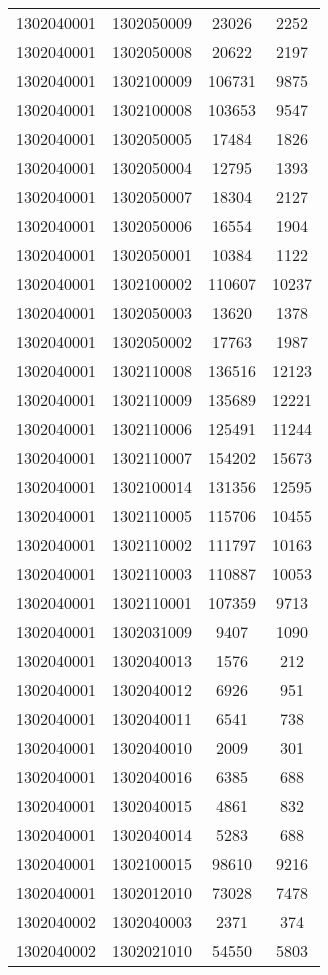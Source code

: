 \begin{longtable}{llcc}
1302040001 & 1302050009 & 23026 & 2252\\
1302040001 & 1302050008 & 20622 & 2197\\
1302040001 & 1302100009 & 106731 & 9875\\
1302040001 & 1302100008 & 103653 & 9547\\
1302040001 & 1302050005 & 17484 & 1826\\
1302040001 & 1302050004 & 12795 & 1393\\
1302040001 & 1302050007 & 18304 & 2127\\
1302040001 & 1302050006 & 16554 & 1904\\
1302040001 & 1302050001 & 10384 & 1122\\
1302040001 & 1302100002 & 110607 & 10237\\
1302040001 & 1302050003 & 13620 & 1378\\
1302040001 & 1302050002 & 17763 & 1987\\
1302040001 & 1302110008 & 136516 & 12123\\
1302040001 & 1302110009 & 135689 & 12221\\
1302040001 & 1302110006 & 125491 & 11244\\
1302040001 & 1302110007 & 154202 & 15673\\
1302040001 & 1302100014 & 131356 & 12595\\
1302040001 & 1302110005 & 115706 & 10455\\
1302040001 & 1302110002 & 111797 & 10163\\
1302040001 & 1302110003 & 110887 & 10053\\
1302040001 & 1302110001 & 107359 & 9713\\
1302040001 & 1302031009 & 9407 & 1090\\
1302040001 & 1302040013 & 1576 & 212\\
1302040001 & 1302040012 & 6926 & 951\\
1302040001 & 1302040011 & 6541 & 738\\
1302040001 & 1302040010 & 2009 & 301\\
1302040001 & 1302040016 & 6385 & 688\\
1302040001 & 1302040015 & 4861 & 832\\
1302040001 & 1302040014 & 5283 & 688\\
1302040001 & 1302100015 & 98610 & 9216\\
1302040001 & 1302012010 & 73028 & 7478\\
1302040002 & 1302040003 & 2371 & 374\\
1302040002 & 1302021010 & 54550 & 5803\\

\end{longtable}
